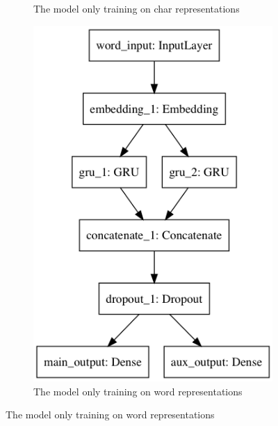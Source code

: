 \begin{figure}[H]
\begin{subfigure}[b]{0.3\textwidth}
        \caption{The model only training on char representations}
        \label{fig:model_chars}    
    \end{subfigure}
    \begin{subfigure}[b]{0.3\textwidth}
        \includegraphics[width=\textwidth]{pictures/model_words.png}
        \caption{The model only training on word representations}
        \label{fig:model_words}
    \end{subfigure}
\end{figure}
